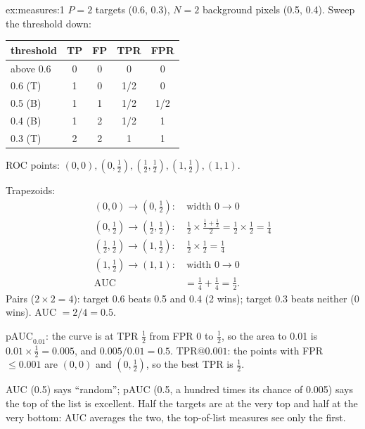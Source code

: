 
\begin{solution}{ex:measures:1}
$P = 2$ targets (0.6, 0.3), $N = 2$ background pixels (0.5, 0.4). Sweep the threshold down:
\begin{center}
\begin{tabular}{lcccc}
\toprule
threshold & TP & FP & TPR & FPR \\
\midrule
above 0.6 & 0 & 0 & 0 & 0 \\
0.6 (T) & 1 & 0 & 1/2 & 0 \\
0.5 (B) & 1 & 1 & 1/2 & 1/2 \\
0.4 (B) & 1 & 2 & 1/2 & 1 \\
0.3 (T) & 2 & 2 & 1 & 1 \\
\bottomrule
\end{tabular}
\end{center}
ROC points: $(0,0), (0,\frac12), (\frac12,\frac12), (1,\frac12), (1,1)$.

Trapezoids:
\begin{align*}
(0,0)\to(0,\tfrac12):&\ \text{width } 0 \to 0\\
(0,\tfrac12)\to(\tfrac12,\tfrac12):&\ \tfrac12 \times \tfrac{\frac12+\frac12}{2} = \tfrac12 \times \tfrac12 = \tfrac14\\
(\tfrac12,\tfrac12)\to(1,\tfrac12):&\ \tfrac12 \times \tfrac12 = \tfrac14\\
(1,\tfrac12)\to(1,1):&\ \text{width } 0 \to 0\\
\text{AUC} &= \tfrac14 + \tfrac14 = \tfrac12.
\end{align*}
Pairs ($2 \times 2 = 4$): target 0.6 beats 0.5 and 0.4 (2 wins); target 0.3 beats neither (0 wins). AUC $= 2/4 =
0.5$.

$\mathrm{pAUC}_{0.01}$: the curve is at TPR $\frac12$ from FPR 0 to $\frac12$, so the area to 0.01 is $0.01 \times
\frac12 = 0.005$, and $0.005 / 0.01 = 0.5$. $\mathrm{TPR}@0.001$: the points with FPR $\le 0.001$ are $(0,0)$ and
$(0, \frac12)$, so the best TPR is $\frac12$.

AUC (0.5) says ``random''; pAUC (0.5, a hundred times its chance of 0.005) says the top of the list is excellent.
Half the targets are at the very top and half at the very bottom: AUC averages the two, the top-of-list measures
see only the first.
\end{solution}

